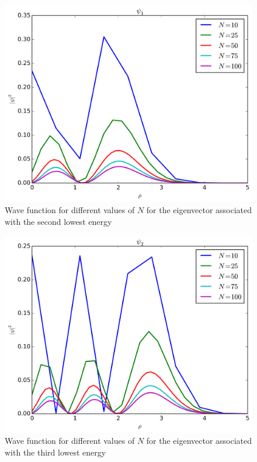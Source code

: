 \documentclass[11pt,a4paper,english,final]{article}
\numberwithin{equation}{section}
\newcommand{\figurewidth}{.85\textwidth}
\begin{document}
\begin{figure}
\centering
\includegraphics[width=\figurewidth]{../results/N_compare_psi1.png}
\caption{Wave function for different values of $N$ for
the eigenvector associated with the second lowest energy}
\label{fig:psi1N}
\end{figure}

\begin{figure}
\centering
\includegraphics[width=\figurewidth]{../results/N_compare_psi2.png}
\caption{Wave function for different values of $N$ for
the eigenvector associated with the third lowest energy}
\label{fig:psi2N}
\end{figure}
\end{document}
